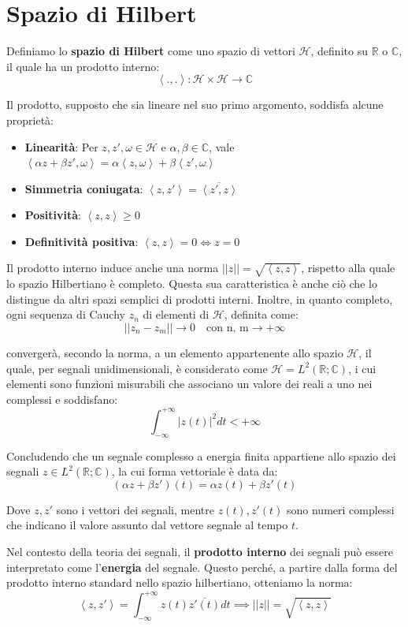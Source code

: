 \section{Spazio di Hilbert}
Definiamo lo \textbf{spazio di Hilbert} come uno spazio di vettori $\mathcal{H}$, definito su $\mathbb{R}$ o $\mathbb{C}$, il quale ha un prodotto
interno: \[
    \left<.,. \right> : \mathcal{H}\times \mathcal{H} \to \mathbb{C}
\]

\noindent Il prodotto, supposto che sia lineare nel suo primo argomento, soddisfa alcune proprietà: \begin{itemize}
    \item \textbf{Linearità}: Per $z,z',\omega\in \mathcal{H}$ e $\alpha, \beta\in \mathbb{C}$, vale $\left<\alpha z + \beta z', \omega\right> =
    \alpha\left<z, \omega \right> + \beta\left<z', \omega \right>$
    \item \textbf{Simmetria coniugata}: $\left<z, z' \right> = \overline{\left<z', z \right>}$
    \item \textbf{Positività}: $\left<z, z \right> \geq 0$
    \item \textbf{Definitività positiva}: $\left<z, z \right> = 0 \iff z = 0$
\end{itemize}

\noindent Il prodotto interno induce anche una norma $||z|| = \sqrt{\left< z, z\right>}$, rispetto alla quale lo spazio Hilbertiano è completo. Questa
sua caratteristica è anche ciò che lo distingue da altri spazi semplici di prodotti interni. Inoltre, in quanto completo, ogni sequenza di Cauchy $z_n$
di elementi di $\mathcal{H}$, definita come: \[
    ||z_n - z_m|| \to 0\quad \text{con n, m} \to +\infty
\]

\noindent convergerà, secondo la norma, a un elemento appartenente allo spazio $\mathcal{H}$, il quale, per segnali unidimensionali, è considerato come
$\mathcal{H} = L^2(\mathbb{R};\mathbb{C})$, i cui elementi sono funzioni misurabili che associano un valore dei reali a uno nei complessi e soddisfano:
\[
    \int_{-\infty}^{+\infty} |z(t)|^2 dt < +\infty
\]

\noindent Concludendo che un segnale complesso a energia finita appartiene allo spazio dei segnali $z\in L^2(\mathbb{R};\mathbb{C})$, la cui forma
vettoriale è data da: \[
    (\alpha z + \beta z')(t) = \alpha z(t) + \beta z'(t)
\]

\noindent Dove $z, z'$ sono i vettori dei segnali, mentre $z(t), z'(t)$ sono numeri complessi che indicano il valore assunto dal vettore segnale al
tempo $t$.\par
Nel contesto della teoria dei segnali, il \textbf{prodotto interno} dei segnali può essere interpretato come l'\textbf{energia} del segnale. Questo
perché, a partire dalla forma del prodotto interno standard nello spazio hilbertiano, otteniamo la norma: \[
    \left<z, z' \right> = \int_{-\infty}^{+\infty} z(t)\overline{z'(t)} dt \implies ||z|| = \sqrt{\left<z, z \right>}
\]

